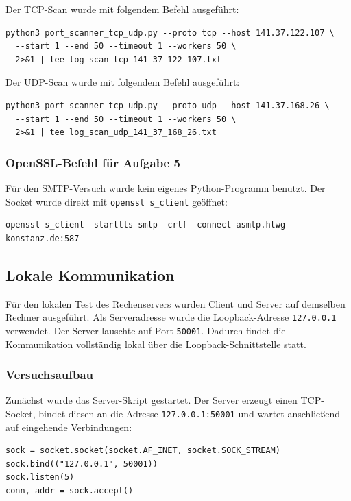\documentclass{kdiartcl}
\begin{document}
Der TCP-Scan wurde mit folgendem Befehl ausgeführt:

\begin{verbatim}
python3 port_scanner_tcp_udp.py --proto tcp --host 141.37.122.107 \
  --start 1 --end 50 --timeout 1 --workers 50 \
  2>&1 | tee log_scan_tcp_141_37_122_107.txt
\end{verbatim}

Der UDP-Scan wurde mit folgendem Befehl ausgeführt:

\begin{verbatim}
python3 port_scanner_tcp_udp.py --proto udp --host 141.37.168.26 \
  --start 1 --end 50 --timeout 1 --workers 50 \
  2>&1 | tee log_scan_udp_141_37_168_26.txt
\end{verbatim}

\subsubsection*{OpenSSL-Befehl für Aufgabe 5}

Für den SMTP-Versuch wurde kein eigenes Python-Programm benutzt. Der Socket wurde direkt mit \texttt{openssl s\_client} geöffnet:

\begin{verbatim}
openssl s_client -starttls smtp -crlf -connect asmtp.htwg-konstanz.de:587
\end{verbatim}


\subsection{Lokale Kommunikation}

Für den lokalen Test des Rechenservers wurden Client und Server auf demselben Rechner
ausgeführt. Als Serveradresse wurde die Loopback-Adresse \texttt{127.0.0.1} verwendet.
Der Server lauschte auf Port \texttt{50001}. Dadurch findet die Kommunikation vollständig
lokal über die Loopback-Schnittstelle statt.

\subsubsection{Versuchsaufbau}

Zunächst wurde das Server-Skript gestartet. Der Server erzeugt einen TCP-Socket, bindet
diesen an die Adresse \texttt{127.0.0.1:50001} und wartet anschließend auf eingehende
Verbindungen:

\begin{verbatim}
sock = socket.socket(socket.AF_INET, socket.SOCK_STREAM)
sock.bind(("127.0.0.1", 50001))
sock.listen(5)
conn, addr = sock.accept()
\end{verbatim}
\end{document}
